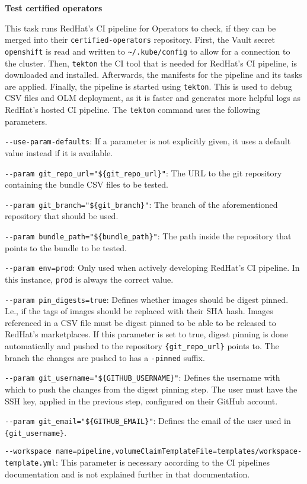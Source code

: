 \textbf{Test certified operators}

This task runs RedHat's CI pipeline for Operators to check, if they can be merged into their \verb|certified-operators| repository.
First, the Vault secret \verb|openshift| is read and written to \verb|~/.kube/config| to allow for a connection to the cluster.
Then, \verb|tekton| the CI tool that is needed for RedHat's CI pipeline, is downloaded and installed.
Afterwards, the manifests for the pipeline and its tasks are applied.
Finally, the pipeline is started using \verb|tekton|.
This is used to debug CSV files and OLM deployment, as it is faster and generates more helpful logs as RedHat's hosted CI pipeline.
The \verb|tekton| command uses the following parameters.

\verb|--use-param-defaults|: If a parameter is not explicitly given, it uses a default value instead if it is available.

\verb|--param git_repo_url="${git_repo_url}"|: The URL to the git repository containing the bundle CSV files to be tested.

\verb|--param git_branch="${git_branch}"|: The branch of the aforementioned repository that should be used.

\verb|--param bundle_path="${bundle_path}"|: The path inside the repository that points to the bundle to be tested.

\verb|--param env=prod|: Only used when actively developing RedHat's CI pipeline.
    In this instance, \verb|prod| is always the correct value.

\verb|--param pin_digests=true|: Defines whether images should be digest pinned.
    I.e., if the tags of images should be replaced with their SHA hash.
    Images referenced in a CSV file must be digest pinned to be able to be released to RedHat's marketplaces.
    If this parameter is set to true, digest pinning is done automatically and pushed to the repository \verb|{git_repo_url}| points to.
    The branch the changes are pushed to has a \verb|-pinned| suffix.

\verb|--param git_username="${GITHUB_USERNAME}"|: Defines the username with which to push the changes from the digest pinning step.
    The user must have the SSH key, applied in the previous step, configured on their GitHub account.

\verb|--param git_email="${GITHUB_EMAIL}"|: Defines the email of the user used in \verb|{git_username}|.

\verb|--workspace name=pipeline,volumeClaimTemplateFile=templates/workspace-template.yml|: This parameter is necessary according to the CI pipelines documentation and is not explained further in that documentation.

